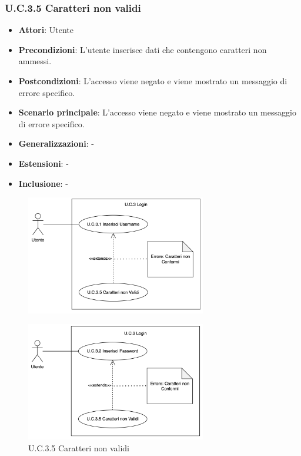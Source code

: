 \subsubsection{U.C.3.5 Caratteri non validi}
\begin{itemize}
    \item \textbf{Attori}: Utente
    \item \textbf{Precondizioni}: L'utente inserisce dati che contengono caratteri non ammessi.
    \item \textbf{Postcondizioni}: L'accesso viene negato e viene mostrato un messaggio di errore specifico.
    \item \textbf{Scenario principale}: L'accesso viene negato e viene mostrato un messaggio di errore specifico.
    \item \textbf{Generalizzazioni}: -
    \item \textbf{Estensioni}: -
    \item \textbf{Inclusione}: -
\end{itemize}
\begin{figure}[H]
    \centering
    \includegraphics[width=0.7\textwidth]{img/U.C.3.5.1.png}
\end{figure}
\begin{figure}[H]
    \centering
    \includegraphics[width=0.7\textwidth]{img/U.C.3.5.2.png}
    \caption{U.C.3.5 Caratteri non validi}
\end{figure}
\newpage

